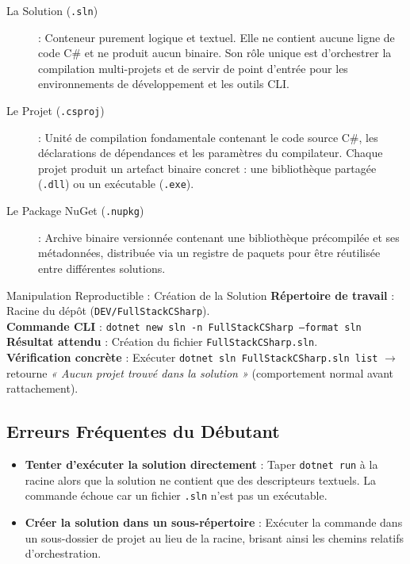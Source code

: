 \documentclass[a4paper,11pt]{report}
\begin{document}
\begin{description}
    \item[\color{secondary}La Solution (\texttt{.sln})] : Conteneur purement logique et textuel. Elle ne contient aucune ligne de code C\# et ne produit aucun binaire. Son rôle unique est d'orchestrer la compilation multi-projets et de servir de point d'entrée pour les environnements de développement et les outils CLI.
    \item[\color{cyanproj!90!black}Le Projet (\texttt{.csproj})] : Unité de compilation fondamentale contenant le code source C\#, les déclarations de dépendances et les paramètres du compilateur. Chaque projet produit un artefact binaire concret : une bibliothèque partagée (\texttt{.dll}) ou un exécutable (\texttt{.exe}).
    \item[\color{accent}Le Package NuGet (\texttt{.nupkg})] : Archive binaire versionnée contenant une bibliothèque précompilée et ses métadonnées, distribuée via un registre de paquets pour être réutilisée entre différentes solutions.
\end{description}

\vspace{0.2cm}

\begin{bestpracticebox}{Manipulation Reproductible : Création de la Solution}
\textbf{Répertoire de travail} : Racine du dépôt (\texttt{DEV/FullStackCSharp}).\\[2pt]
\textbf{Commande CLI} : \texttt{dotnet new sln -n FullStackCSharp --format sln}\\[2pt]
\textbf{Résultat attendu} : Création du fichier \texttt{FullStackCSharp.sln}.\\[2pt]
\textbf{Vérification concrète} : Exécuter \texttt{dotnet sln FullStackCSharp.sln list} $\longrightarrow$ retourne \textit{« Aucun projet trouvé dans la solution »} (comportement normal avant rattachement).
\end{bestpracticebox}

\vspace{0.2cm}

\subsection*{Erreurs Fréquentes du Débutant}

\begin{itemize}
    \item \textbf{Tenter d'exécuter la solution directement} : Taper \texttt{dotnet run} à la racine alors que la solution ne contient que des descripteurs textuels. La commande échoue car un fichier \texttt{.sln} n'est pas un exécutable.
    \item \textbf{Créer la solution dans un sous-répertoire} : Exécuter la commande dans un sous-dossier de projet au lieu de la racine, brisant ainsi les chemins relatifs d'orchestration.
\end{itemize}
\end{document}
